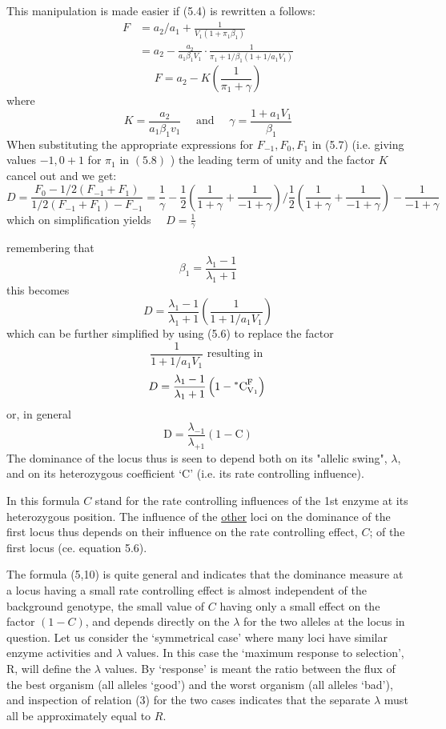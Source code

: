This manipulation is made easier if (5.4) is rewritten a follows:
%
$$
\begin{aligned}
F & =a_{2} / a_{1}+\frac{1}{V_{1}\left(1+\pi_{1} \beta_{1}\right)} \\
& =a_{2}-\frac{a_{2}}{a_{1} \beta_{1} V_{1}} \cdot \frac{1}{\pi_{1}+1 / \beta_{1}\left(1+1 / a_{1} V_{1}\right)}
\end{aligned}
$$
%
\begin{equation}
F = a_{2}-K\left(\frac{1}{\pi_{1}+\gamma}\right)
\label{eqn:508}
\end{equation}
%
where 
%
$$K=\frac{a_{2}}{a_{1} \beta_{1} v_{1}} \quad \mbox{ and } \quad \gamma=\frac{1+a_{1} V_{1}}{\beta_{1}}$$
%
When substituting the appropriate expressions for $F_{-1}, F_{0}, F_{1}$ in (5.7) (i.e. giving values $-1,0+1$ for $\pi_{1}$ in $(5.8)$ ) the leading term of unity and the factor $K$ cancel out and we get:
%
$$
D = \frac{F_{0}-1/2\left(F_{-1}+F_{1}\right)}{1/2\left(F_{-1}+F_{1}\right)-F_{-1}} = \frac{1}{\gamma}-\frac{1}{2} \left(\frac{1}{1+\gamma} + \frac{1}{-1+\gamma}\right) \bigg/ \frac{1}{2}\left(\frac{1}{1+\gamma} + \frac{1}{-1+\gamma}\right)-\frac{1}{-1+\gamma}
$$
%
which on simplification yields $\quad D=\frac{1}{\gamma}$

remembering that
%
$$
\beta_{1}=\frac{\lambda_{1}-1}{\lambda_{1}+1} 
$$
this becomes
$$
D=\frac{\lambda_{1}-1}{\lambda_{1}+1}\left(\frac{1}{1+1 / a_{1} V_{1}}\right)
$$
%
which can be further simplified by using (5.6) to replace the factor
%
$$ \frac{1}{1+1 / a_{1} V_{1}} \mbox{ resulting in } $$
%
\begin{equation}
D = \frac{\lambda_{1}-1}{\lambda_{1}+1}\left(1-\mathrm{^{*}C}_{\mathrm{V}_{1}}^{\mathrm{F}}\right) \\
\label{eqn:508}
\end{equation}
or, in general 
$$
\mathrm{D}=\frac{\lambda_{-1}}{\lambda_{+1}}(1-\mathrm{C})
$$
The dominance of the locus thus is seen to depend both on its "allelic swing", $\lambda$, and on its heterozygous coefficient `C' (i.e. its rate controlling influence).

In this formula $C$ stand for the rate controlling influences of the 1st enzyme at its heterozygous position. The influence of the \underline{other} loci on the dominance of the first locus thus depends on their
influence on the rate controlling effect, $C$; of the first locus (ce. equation 5.6).

The formula (5,10) is quite general and indicates that the dominance measure at a locus having a small rate controlling effect is almost independent of the background genotype, the small value of $C$ having only a small effect on the factor $(1 - C)$, and depends directly on the $\lambda$ for the two alleles at the locus in question. Let us consider the `symmetrical case' where many loci have similar enzyme activities and $\lambda$ values. In this case the `maximum response to selection', R, will define the $\lambda$ values. By `response' is meant the ratio between the flux of the best organism (all alleles `good') and the worst organism (all alleles `bad'), and inspection of relation (3) for the two cases indicates that the separate $\lambda$ must all be approximately equal to $R$.


